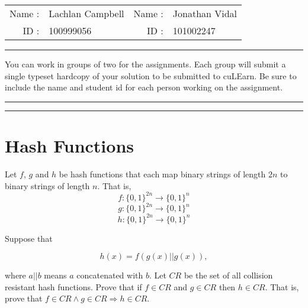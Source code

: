 \documentclass[12pt, letterpaper]{article}
\begin{document}
{\Large
\begin{tabular}{rm{6cm}rm{6cm}}
Name :  & Lachlan Campbell & Name : & Jonathan Vidal           \\
ID :    & 100999056   & ID :   & 101002247
\end{tabular}
}

\bigskip
\hrule
\bigskip


You can work in groups of two for the assignments. Each group will submit a single
typeset hardcopy of your solution to be submitted to cuLEarn. Be sure to include the name and student id for
each person working on the assignment.  

\bigskip   %
\hrule     %
\bigskip   %
\hrule     %



\section{Hash Functions}

Let $f$, $g$ and $h$ be hash functions that each map binary strings of length $2n$ to binary strings of length $n$. That is,
\[ f\colon \{0,1\}^{2n} \to \{0,1\}^n \]
\[ g\colon \{0,1\}^{2n} \to \{0,1\}^n \]
\[ h\colon \{0,1\}^{2n} \to \{0,1\}^n \]

Suppose that  

 \[h(x) = f( g(x) || g(x) ),\]

where $a||b$ means $a$ concatenated with $b$.  
Let $CR$ be the set of all collision resistant hash functions. Prove that if $f \in CR$ and $g \in CR$ then $h \in CR$. That is, prove that $f \in CR \land g \in CR \Rightarrow h \in CR$.
\end{document}
